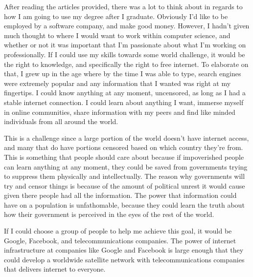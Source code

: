 \documentclass[12pt,letterpaper]{article}
\begin{document}
After reading the articles provided, there was a lot to think about in regards to how I am going to use my degree after I graduate. Obviously I'd like to be employed by a software company, and make good money. However, I hadn't given much thought to where I would want to work within computer science, and whether or not it was important that I’m passionate about what I'm working on professionally. If I could use my skills towards some world challenge, it would be the right to knowledge, and specifically the right to free internet. To elaborate on that, I grew up in the age where by the time I was able to type, search engines were extremely popular and any information that I wanted was right at my fingertips. I could know anything at any moment, uncensored, as long as I had a stable internet connection. I could learn about anything I want, immerse myself in online communities, share information with my peers and find like minded individuals from all around the world.\par

This is a challenge since a large portion of the world doesn't have internet access, and many that do have portions censored based on which country they're from. This is something that people should care about because if impoverished people can learn anything at any moment, they could be saved from governments trying to suppress them physically and intellectually. The reason why governments will try and censor things is because of the amount of political unrest it would cause given there people had all the information. The power that information could have on a population is unfathomable, because they could learn the truth about how their government is perceived in the eyes of the rest of the world.\par

If I could choose a group of people to help me achieve this goal, it would be Google, Facebook, and telecommunications companies. The power of internet infrastructure at companies like Google and Facebook is large enough that they could develop a worldwide satellite network with telecommunications companies that delivers internet to everyone.

\clearpage
\end{document}
